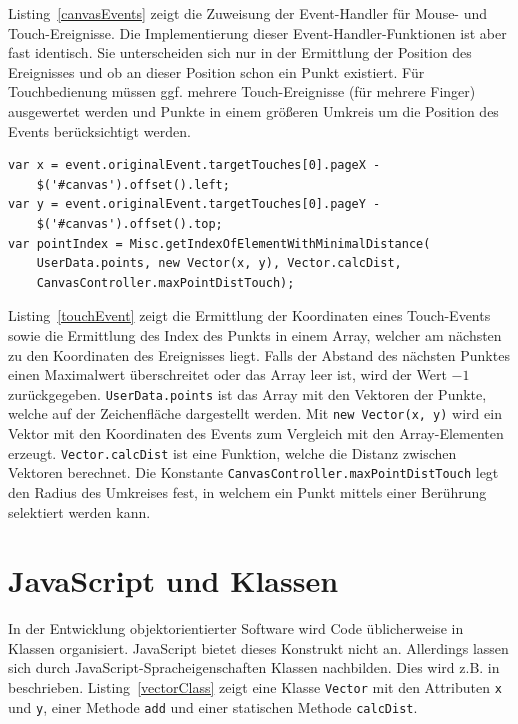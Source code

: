 Listing~\ref{canvasEvents} zeigt die Zuweisung der Event-Handler für Mouse- und Touch-Ereignisse. Die Implementierung dieser Event-Handler-Funktionen ist aber fast identisch. Sie unterscheiden sich nur in der Ermittlung der Position des Ereignisses und ob an dieser Position schon ein Punkt existiert. Für Touchbedienung müssen ggf. mehrere Touch-Ereignisse (für mehrere Finger) ausgewertet werden und Punkte in einem größeren Umkreis um die Position des Events berücksichtigt werden.

\begin{lstlisting}[float = htbp, caption={Touch-Event-Handler},label=touchEvent]
var x = event.originalEvent.targetTouches[0].pageX -
	$('#canvas').offset().left;
var y = event.originalEvent.targetTouches[0].pageY -
	$('#canvas').offset().top;
var pointIndex = Misc.getIndexOfElementWithMinimalDistance(
	UserData.points, new Vector(x, y), Vector.calcDist,
	CanvasController.maxPointDistTouch);
\end{lstlisting}

Listing~\ref{touchEvent} zeigt die Ermittlung der Koordinaten eines Touch-Events sowie die Ermittlung des Index des Punkts in einem Array, welcher am nächsten zu den Koordinaten des Ereignisses liegt. Falls der Abstand des nächsten Punktes einen Maximalwert überschreitet oder das Array leer ist, wird der Wert $-1$ zurückgegeben. \verb+UserData.points+ ist das Array mit den Vektoren der Punkte, welche auf der Zeichenfläche dargestellt werden. Mit \verb+new Vector(x, y)+ wird ein Vektor mit den Koordinaten des Events zum Vergleich mit den Array-Elementen erzeugt. \verb+Vector.calcDist+ ist eine Funktion, welche die Distanz zwischen Vektoren berechnet. Die Konstante \verb+CanvasController.maxPointDistTouch+ legt den Radius des Umkreises fest, in welchem ein Punkt mittels einer Berührung selektiert werden kann. 

\section*{JavaScript und Klassen}
In der Entwicklung objektorientierter Software wird Code üblicherweise in Klassen organisiert. JavaScript bietet dieses Konstrukt nicht an. Allerdings lassen sich durch JavaScript-Spracheigenschaften Klassen nachbilden. Dies wird z.B. in \autocite{Flanagan2011} beschrieben. Listing~\ref{vectorClass} zeigt eine Klasse \verb+Vector+ mit den Attributen \verb+x+ und \verb+y+, einer Methode \verb+add+ und einer statischen Methode \verb+calcDist+.

